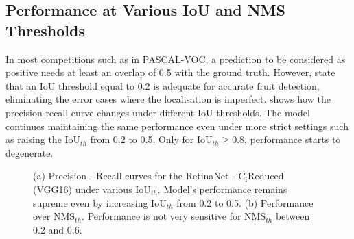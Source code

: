 \subsection{Performance at Various IoU  and NMS Thresholds}\label{nms_threshold}
In most competitions such as in PASCAL-VOC, a prediction to be considered as positive needs at least an overlap of 0.5 with the ground truth. However, \cite{bargoti2017deep} state that an IoU threshold equal to 0.2 is adequate for accurate fruit detection, eliminating the error cases where the localisation is imperfect.  shows how the precision-recall curve changes under different IoU thresholds. The model continues maintaining the same performance even under more strict settings such as raising the $\text{IoU}_{th}$ from 0.2 to 0.5. Only for $\text{IoU}_{th} \geq 0.8$, performance starts to degenerate.

 \begin{figure}[!htb]
  \centering
  \caption{(a) Precision - Recall curves for the RetinaNet - $\text{C}_\text{i}\text{Reduced}$ (VGG16) under various $\text{IoU}_{th}$. Model's performance remains supreme even by increasing  $\text{IoU}_{th}$ from 0.2 to 0.5. (b) Performance over $\text{NMS}_{th}$. Performance is not very sensitive for $\text{NMS}_{th}$ between 0.2 and 0.6.}
  \label{fig5}
\end{figure}

